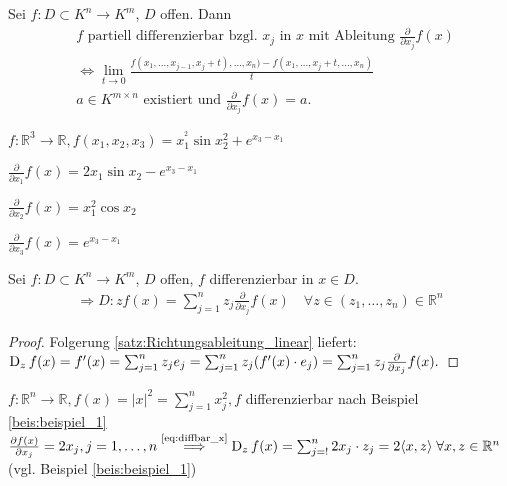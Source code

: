     \begin{folgerung}
        Sei $f: D\subset K^n \to K^m$, $D$ offen. Dann 
        \begin{align}
        &f \text{ partiell differenzierbar bzgl. } x_j \text{ in } x \text{ mit Ableitung } \frac{\partial}{\partial x_j}f(x) \nonumber\\ 
        &\Longleftrightarrow \lim_{t\to 0} \frac{f(x_1,\dots,x_{j-1},x_j+t),\dots,x_n)-f(x_1,\dots,x_{j}+t,\dots,x_n)}{t}\label{eq:equiv_richtungsabl}\\ 
        &a \in K^{m\times n} \text{ existiert und } \frac{\partial}{\partial x_j}f(x) = a.
        \end{align} 
    \end{folgerung}
    \begin{beispiel}\label{beis:beispiel_1}
        $f: \mathbb{R}^3 \to \mathbb{R}, f(x_1,x_2,x_3) = x_1^{^2}\sin x_2^2 + e^{x_3-x_1}$
        \begin{compactitem}
            \item $\frac{\partial}{\partial x_1}f(x) = 2x_1 \sin x_2 - e^{x_3 -x_1}$
            \item $\frac{\partial}{\partial x_2}f(x) = x_1^2 \cos x_2$
            \item $\frac{\partial}{\partial x_3}f(x) = e^{x_3 -x_1}$
        \end{compactitem}
    \end{beispiel}
    \begin{folgerung}\label{folg:diffbar_x}
        Sei $f: D \subset K^n \to K^m$, $D$ offen, $f$ differenzierbar in $x \in D$.
        \begin{align}
            \Rightarrow D: zf(x) = \sum_{j=1}^{n} z_j \frac{\partial}{\partial x_j}f(x)\quad \forall z \in (z_1,\dots, z_n) \in \mathbb{R}^n \label{eq:diffbar_x}
        \end{align}
    \end{folgerung}
    \begin{proof}
        Folgerung \ref{satz:Richtungsableitung_linear} liefert: $\operatorname{D}_z f(x) = f^{\prime}(x) = \sum_{j=1}^{n}z_je_j = \sum_{j=1}^{n}z_j(f^{\prime}(x)\cdot e_j) = \sum_{j=1}^{n} z_j \frac{\partial}{\partial x_j}f(x).$
    \end{proof}
    \begin{beispiel}%
        $f: \mathbb{R}^n \to \mathbb{R}, f(x) = \vert x \vert^2 = \sum_{j=1}^{n}x_j^2, f$ differenzierbar nach Beispiel \ref{beis:beispiel_1} $\frac{\partial f(x)}{\partial x_j}= 2x_j, j = 1, \dots,n \overset{\text{\eqref{eq:diffbar_x}}}{\Longrightarrow} \operatorname{D}_z f(x) = \sum_{j=!}^{n}2 x_j \cdot z_j = 2 \langle x,z \rangle \; \forall x,z \in \mathbb{R}^n$ (vgl. Beispiel \ref{beis:beispiel_1})
    \end{beispiel}

